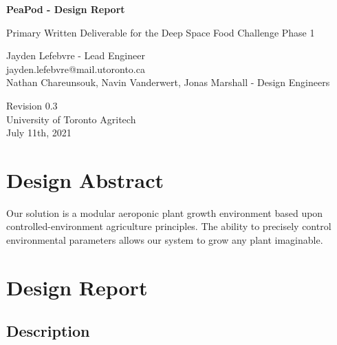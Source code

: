 \documentclass{report}
\begin{document}
\begin{titlepage}
    \begin{center}
        \vspace*{1.2cm}

        \textbf{\large{PeaPod - Design Report}}

        \vspace{0.5cm}

        Primary Written Deliverable for the Deep Space Food Challenge Phase 1

        \vfill

        Jayden Lefebvre - Lead Engineer\\\small{jayden.lefebvre@mail.utoronto.ca}\\
        \vspace{1cm}
        Nathan Chareunsouk, Navin Vanderwert, Jonas Marshall - Design Engineers

        \vspace{2.5cm}

        Revision 0.3\\
        University of Toronto Agritech\\
        July 11th, 2021

    \end{center}
\end{titlepage}

\thispagestyle{plain}

\tableofcontents
\newpage

\section{Design Abstract}
Our solution is a modular aeroponic plant growth environment based upon controlled-environment agriculture principles.
The ability to precisely control environmental parameters allows our system to grow any plant imaginable.

\section{Design Report}

\subsection{Description}
\label{sec:description}
\end{document}
